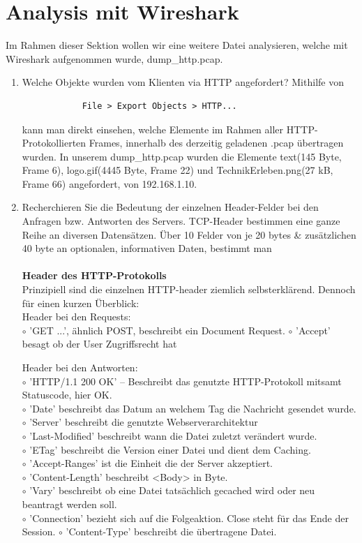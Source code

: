 \documentclass[11pt]{article}
\begin{document}
    \section{Analysis mit Wireshark}
    Im Rahmen dieser Sektion wollen wir eine weitere Datei analysieren, welche mit Wireshark aufgenommen wurde, dump\_http.pcap.
    \begin{enumerate}[\thesection .1]
        \item Welche Objekte wurden vom Klienten via HTTP angefordert?
        Mithilfe von
        \begin{verbatim}
            File > Export Objects > HTTP...
        \end{verbatim}
        kann man direkt einsehen, welche Elemente im Rahmen aller HTTP-Protokollierten Frames, innerhalb des derzeitig geladenen .pcap übertragen wurden.
        In unserem dump\_http.pcap wurden die Elemente text(145 Byte, Frame 6), logo.gif(4445 Byte, Frame 22) und TechnikErleben.png(27 kB, Frame 66) angefordert, von 192.168.1.10.

        \item Recherchieren Sie die Bedeutung der einzelnen Header-Felder bei den Anfragen bzw. Antworten des Servers.
        TCP-Header bestimmen eine ganze Reihe an diversen Datensätzen. Über 10 Felder von je 20 bytes \& zusätzlichen 40 byte
        an optionalen, informativen Daten, bestimmt man\\\\

        \textbf{Header des HTTP-Protokolls}\\
        Prinzipiell sind die einzelnen HTTP-header ziemlich selbsterklärend. Dennoch für einen kurzen Überblick:\\
        Header bei den Requests:\\
        $\circ$ 'GET ...', ähnlich POST, beschreibt ein Document Request.
        $\circ$ 'Accept' besagt ob der User Zugriffsrecht hat

        Header bei den Antworten:\\
        $\circ$ 'HTTP/1.1 200 OK' -- Beschreibt das genutzte HTTP-Protokoll mitsamt Statuscode, hier OK.\\
        $\circ$ 'Date' beschreibt das Datum an welchem Tag die Nachricht gesendet wurde.\\
        $\circ$ 'Server' beschreibt die genutzte Webserverarchitektur\\
        $\circ$ 'Last-Modified' beschreibt wann die Datei zuletzt verändert wurde.\\
        $\circ$ 'ETag' beschreibt die Version einer Datei und dient dem Caching.\\
        $\circ$ 'Accept-Ranges' ist die Einheit die der Server akzeptiert.\\
        $\circ$ 'Content-Length' beschreibt <Body> in Byte.\\
        $\circ$ 'Vary' beschreibt ob eine Datei tatsächlich gecached wird oder neu beantragt werden soll.\\
        $\circ$ 'Connection' bezieht sich auf die Folgeaktion. Close steht für das Ende der Session.
        $\circ$ 'Content-Type' beschreibt die übertragene Datei.\\


\end{enumerate}
\end{document}
